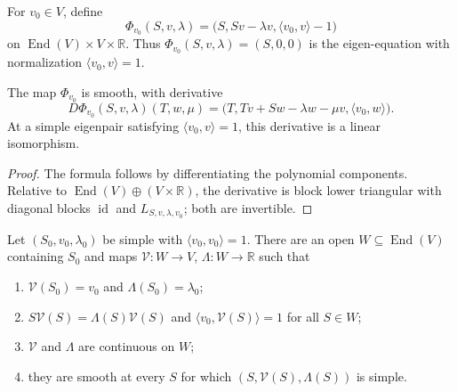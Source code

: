 \begin{definition}
\label{def:augmented-eigen-equation}
\leanok
For $v_0\in V$, define
\[
\Phi_{v_0}(S,v,\lambda)
=\bigl(S,Sv-\lambda v,\langle v_0,v\rangle-1\bigr)
\]
on $\operatorname{End}(V)\times V\times\mathbb R$. Thus
$\Phi_{v_0}(S,v,\lambda)=(S,0,0)$ is the eigen-equation with normalization
$\langle v_0,v\rangle=1$.
\end{definition}

\begin{lemma}
\label{lem:augmented-eigen-equation-derivative}
\leanok
{}
The map $\Phi_{v_0}$ is smooth, with derivative
\[
D\Phi_{v_0}(S,v,\lambda)(T,w,\mu)
=\bigl(T,Tv+Sw-\lambda w-\mu v,\langle v_0,w\rangle\bigr).
\]
At a simple eigenpair satisfying $\langle v_0,v\rangle=1$, this derivative is a
linear isomorphism.
\end{lemma}

\begin{proof}
\leanok
{}
\sketch The formula follows by differentiating the polynomial components. Relative
to $\operatorname{End}(V)\oplus(V\times\mathbb R)$, the derivative is block lower
triangular with diagonal blocks $\operatorname{id}$ and
$L_{S,v,\lambda,v_0}$; both are invertible.
\end{proof}

\begin{proposition}
\label{prop:smooth-eigen-selection}
\leanok
{}
Let $(S_0,v_0,\lambda_0)$ be simple with $\langle v_0,v_0\rangle=1$. There are
an open $W\subseteq\operatorname{End}(V)$ containing $S_0$ and maps
$\mathcal V\colon W\to V$, $\Lambda\colon W\to\mathbb R$ such that
\begin{enumerate}
\item $\mathcal V(S_0)=v_0$ and $\Lambda(S_0)=\lambda_0$;
\item $S\mathcal V(S)=\Lambda(S)\mathcal V(S)$ and
$\langle v_0,\mathcal V(S)\rangle=1$ for all $S\in W$;
\item $\mathcal V$ and $\Lambda$ are continuous on $W$;
\item they are smooth at every $S$ for which
$(S,\mathcal V(S),\Lambda(S))$ is simple.
\end{enumerate}
\end{proposition}

